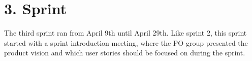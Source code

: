 \chapter{3. Sprint}
The third sprint ran from April 9th until April 29th. Like sprint 2, this sprint started with a sprint introduction meeting, where the PO group presented the product vision and which user stories should be focused on during the sprint. 

